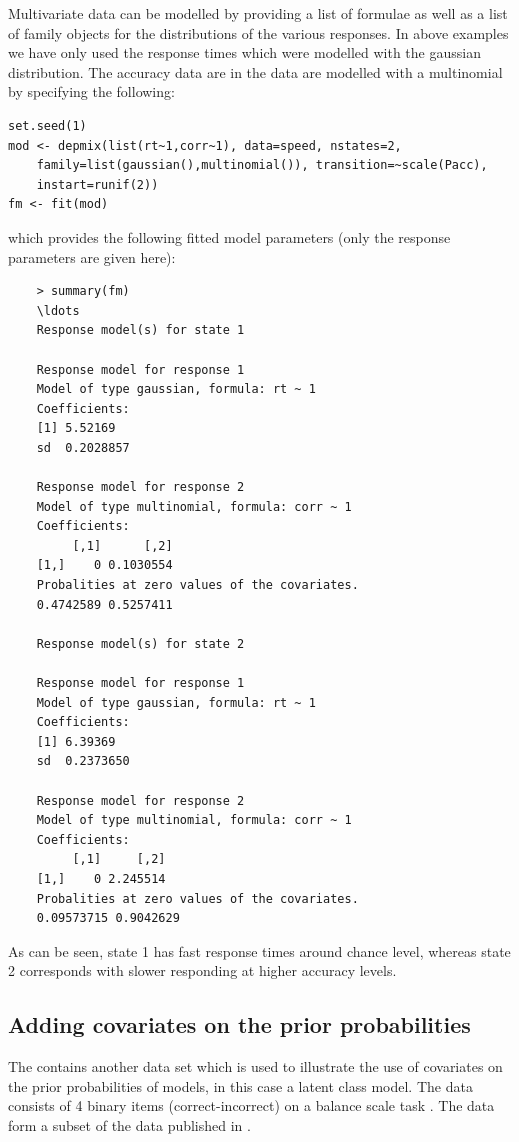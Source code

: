 \documentclass[article]{jss}
\begin{document}
Multivariate data can be modelled by providing a list of formulae as 
well as a list of family objects for the distributions of the various 
responses. In above examples we have only used the response times 
which were modelled with the gaussian distribution. The accuracy data 
are in the  data are modelled with a multinomial by 
specifying the following: 
\begin{verbatim}
set.seed(1)
mod <- depmix(list(rt~1,corr~1), data=speed, nstates=2, 
	family=list(gaussian(),multinomial()), transition=~scale(Pacc), 
	instart=runif(2))
fm <- fit(mod)
\end{verbatim}
which provides the following fitted model parameters (only the 
response parameters are given here): 
\begin{verbatim}
	> summary(fm)
	\ldots 
	Response model(s) for state 1 

	Response model for response 1 
	Model of type gaussian, formula: rt ~ 1
	Coefficients: 
	[1] 5.52169
	sd  0.2028857 

	Response model for response 2 
	Model of type multinomial, formula: corr ~ 1
	Coefficients: 
		 [,1]      [,2]
	[1,]    0 0.1030554
	Probalities at zero values of the covariates.
	0.4742589 0.5257411 

	Response model(s) for state 2 

	Response model for response 1 
	Model of type gaussian, formula: rt ~ 1
	Coefficients: 
	[1] 6.39369
	sd  0.2373650 

	Response model for response 2 
	Model of type multinomial, formula: corr ~ 1
	Coefficients: 
		 [,1]     [,2]
	[1,]    0 2.245514
	Probalities at zero values of the covariates.
	0.09573715 0.9042629 	
\end{verbatim}
As can be seen, state 1 has fast response times around chance level, 
whereas state 2 corresponds with slower responding at higher accuracy 
levels. 


\subsection{Adding covariates on the prior probabilities}

The  contains another data set which is used to
illustrate the use of covariates on the prior probabilities of models,
in this case a latent class model. The  data consists 
of 4 binary items (correct-incorrect) on a balance scale task 
\citet{Siegler1981}. The data form a subset of the data published in 
\citet{Jansen2002}. 
\end{document}
